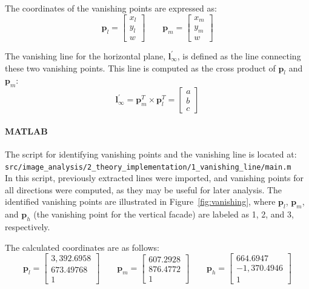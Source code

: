 \documentclass{Academic}
\begin{document}
\noindent The coordinates of the vanishing points are expressed as:
\begin{equation}\mathbf{p}_l=\begin{bmatrix} x_l \\ y_l \\ w \end{bmatrix} \qquad \mathbf{p}_m=\begin{bmatrix} x_m \\ y_m \\ w \end{bmatrix}\end{equation}

The vanishing line for the horizontal plane, $\mathbf{l}^\prime_{\infty}$, is defined as the line connecting these two vanishing points. 
This line is computed as the cross product of $\mathbf{p}_l$ and $\mathbf{p}_m$:
\begin{equation}\mathbf{l}^\prime_{\infty}= \mathbf{p}_m^T \times \mathbf{p}_l^T=\begin{bmatrix} a \\ b \\ c \end{bmatrix}\end{equation}

\paragraph*{MATLAB}
The script for identifying vanishing points and the vanishing line is located at: \\ 
\texttt{src/image\_analysis/2\_theory\_implementation/1\_vanishing\_line/main.m} \\
In this script, previously extracted lines were imported, and vanishing points for all directions were computed, as they may be useful for later analysis.
The identified vanishing points are illustrated in Figure~\ref{fig:vanishing}, where $\mathbf{p}_l$, $\mathbf{p}_m$, and $\mathbf{p}_h$ (the vanishing point for the vertical facade) are labeled as 1, 2, and 3, respectively.

\noindent The calculated coordinates are as follows:
\begin{equation}\mathbf{p}_l=\begin{bmatrix}
    3,392.6958 \\ 673.49768 \\ 1
\end{bmatrix} \qquad \mathbf{p}_m=\begin{bmatrix}
    607.2928 \\ 876.4772 \\ 1
\end{bmatrix} \qquad \mathbf{p}_h=\begin{bmatrix}
    664.6947 \\ -1,370.4946 \\ 1
\end{bmatrix}\end{equation}
\end{document}
